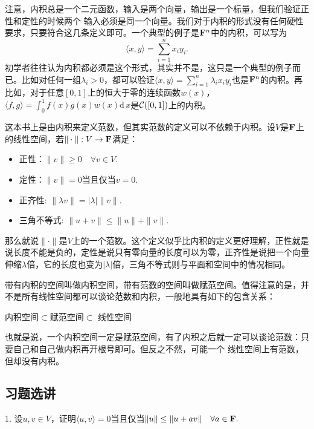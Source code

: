 \documentclass[hyperref,]{ctexart}
\providecommand{\tightlist}{%
  \setlength{\itemsep}{0pt}\setlength{\parskip}{0pt}}
\begin{document}
注意，内积总是一个二元函数，输入是两个向量，输出是一个标量，但我们验证正性和定性的时候两个
输入必须是同一个向量。我们对于内积的形式没有任何硬性要求，只要符合这几条定义即可。一个典型的例子是\(\mathbf{F}^n\)中的内积，可以写为
\[\langle x,y\rangle = \sum_{i=1}^n x_iy_i.\]
初学者往往认为内积都必须是这个形式，其实并不是，这只是一个典型的例子而已。比如对任何一组\(\lambda_i>0\)，都可以验证\(\langle x,y\rangle = \sum_{i=1}^n \lambda_ix_iy_i\)也是\(\mathbf{F}^n\)的内积。再比如，对于任意\([0,1]\)上的恒大于零的连续函数\(w(x)\)，\(\langle f,g \rangle = \int_0^1 f(x)g(x)w(x)\mathrm{d}\, x\)是\(\mathcal{C}([0,1])\)上的内积。

这本书上是由内积来定义范数，但其实范数的定义可以不依赖于内积。设\(V\)是\(\mathbf{F}\)上的线性空间，若\(\|\cdot\|:V\rightarrow \mathbf{F}\)满足：

\begin{itemize}
\tightlist
\item
  正性：\(\|v\|\ge 0\quad \forall v\in V.\)
\item
  定性：\(\|v\|=0\)当且仅当\(v=0\).
\item
  正齐性: \(\|\lambda v\| = |\lambda|\|v\|\).
\item
  三角不等式: \(\|u+v\|\le \|u\|+\|v\|.\)
\end{itemize}

那么就说\(\|\cdot\|\)是\(V\)上的一个范数。这个定义似乎比内积的定义更好理解，正性就是说长度不能是负的，定性是说只有零向量的长度可以为零，正齐性是说把一个向量伸缩\(\lambda\)倍，它的长度也变为\(|\lambda|\)倍，三角不等式则与平面和空间中的情况相同。

带有内积的空间叫做内积空间，带有范数的空间叫做赋范空间。值得注意的是，并不是所有线性空间都可以谈论范数和内积，一般地具有如下的包含关系：

\begin{center}
内积空间$\subset$赋范空间$\subset$ 线性空间
\end{center}

也就是说，一个内积空间一定是赋范空间，有了内积之后就一定可以谈论范数：只要自己和自己做内积再开根号即可。但反之不然，可能一个
线性空间上有范数，但却没有内积。

\subsection{习题选讲}\label{ux4e60ux9898ux9009ux8bb2}

\noindent{} 1.
设\(u,v\in V\)，证明\(\langle u,v\rangle =0\)当且仅当\(\|u\| \le \|u+av\|\quad \forall a\in\mathbf{F}.\)

\smallskip
\end{document}
